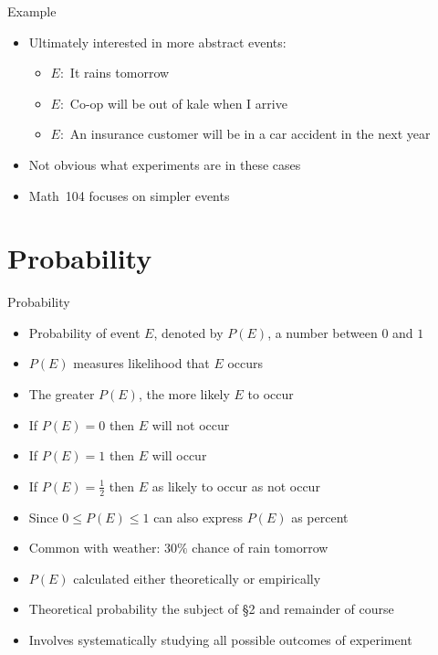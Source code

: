 \documentclass{beamer}
\theoremstyle{definition}
\begin{document}
\begin{frame}{Example}
\begin{itemize}
\item Ultimately interested in more abstract events:
\begin{itemize}
\item $E:$ It rains tomorrow
\item $E:$ Co-op will be out of kale when I arrive
\item $E:$ An insurance customer will be in a car accident in the next year
\end{itemize}
\item Not obvious what experiments are in these cases
\item Math~104 focuses on simpler events
\end{itemize}
\end{frame}

\section{Probability}
\begin{frame}{Probability}
\begin{itemize}
\item \alert{Probability of event $E$}, denoted by $P\left(E\right)$,
a number between $0$ and $1$
\item $P\left(E\right)$ measures likelihood that $E$ occurs
\item The greater $P\left(E\right)$, the more likely $E$ to occur
\item If $P\left(E\right)=0$ then $E$ will not occur
\item If $P\left(E\right)=1$ then $E$ will occur
\item If $P\left(E\right)=\frac{1}{2}$ then $E$ 
as likely to occur as not occur
\item Since $0\le P\left(E\right)\le 1$ can also express
$P\left(E\right)$ as percent
\item Common with weather: \alert{$30\%$ chance of rain tomorrow}
\item $P\left(E\right)$ calculated either \alert{theoretically}
or \alert{empirically}
\item Theoretical probability the subject of \S2 and remainder of course
\item Involves systematically studying all possible outcomes of experiment
\end{itemize}
\end{frame}
\end{document}
